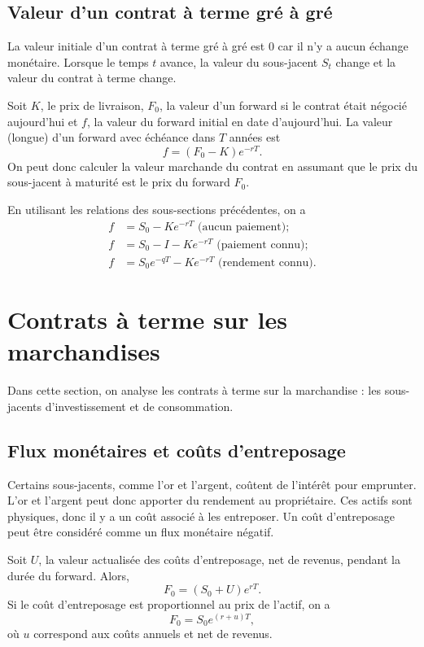 \subsection{Valeur d'un contrat à terme gré à gré}

La valeur initiale d'un contrat à terme gré à gré est 0 car il n'y a aucun échange monétaire. Lorsque le temps $t$ avance, la valeur du sous-jacent $S_t$ change et la valeur du contrat à terme change. 

Soit $K$, le prix de livraison, $F_0$, la valeur d'un forward si le contrat était négocié aujourd'hui et $f$, la valeur du forward initial en date d'aujourd'hui. La valeur (longue) d'un forward avec échéance dans $T$ années est
$$f = (F_0 - K) e^{-rT}.$$
On peut donc calculer la valeur marchande du contrat en assumant que le prix du sous-jacent à maturité est le prix du forward $F_0$. 

En utilisant les relations des sous-sections précédentes, on a 
\begin{align*}
f &= S_0 - Ke^{-rT} \text{ (aucun paiement)};\\
f &= S_0 - I - Ke^{-rT} \text{ (paiement connu)};\\
f &= S_0e^{-qT} - Ke^{-rT}  \text{ (rendement connu)}.
\end{align*}

\section{Contrats à terme sur les marchandises}

Dans cette section, on analyse les contrats à terme sur la marchandise : les sous-jacents d'investissement et de consommation. 

\subsection{Flux monétaires et coûts d'entreposage}

Certains sous-jacents, comme l'or et l'argent, coûtent de l'intérêt pour emprunter. L'or et l'argent peut donc apporter du rendement au propriétaire. Ces actifs sont physiques, donc il y a un coût associé à les entreposer. Un coût d'entreposage peut être considéré comme un flux monétaire négatif. 

Soit $U$, la valeur actualisée des coûts d'entreposage, net de revenus, pendant la durée du forward. Alors, 
$$F_0 = (S_0 + U) e^{rT}.$$
Si le coût d'entreposage est proportionnel au prix de l'actif, on a 
$$F_0 = S_0 e^{(r + u)T},$$
où $u$ correspond aux coûts annuels et net de revenus. 

